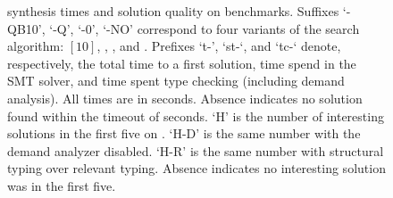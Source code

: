 \documentclass[acmsmall]{acmart}
\begin{document}
\newcommand{\interestingCount}{32\xspace}


\begin{figure}
    \resizebox{\textwidth}{!}{
    
    }

  \caption{\tool synthesis times and solution quality on \benchmarkCount benchmarks.
  Suffixes `-QB10', `-Q', `-0', `-NO'
  correspond to four variants of the search algorithm:
  \mQryTypeBounded$[10]$, \mQryType, \mTopType, and \mNoGar.
  Prefixes `t-', `st-`, and `tc-` denote, respectively,
  the total time to a first solution,
  time spend in the SMT solver,
  and time spent type checking (including demand analysis).
  All times are in seconds.
  Absence indicates no solution found within the timeout of \timeout seconds.
  `H' is the number of interesting solutions in the first five on \tool.
  `H-D' is the same number with the demand analyzer disabled.
  `H-R' is the same number with structural typing over relevant typing.
  Absence indicates no interesting solution was in the first five.
  }
\end{figure}
\end{document}
